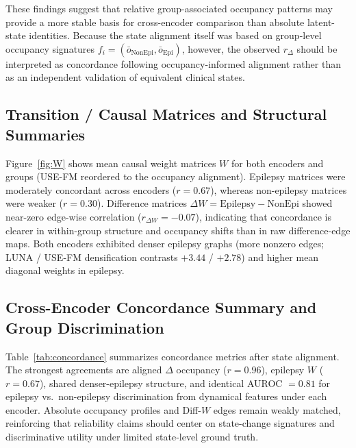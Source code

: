 These findings suggest that relative group-associated occupancy patterns may
provide a more stable basis for cross-encoder comparison than absolute
latent-state identities. Because the state alignment itself was based on
group-level occupancy signatures
$f_i=(\bar{o}_{\mathrm{NonEpi}},\bar{o}_{\mathrm{Epi}})$,
however, the observed $r_{\Delta}$ should be interpreted as concordance
following occupancy-informed alignment rather than as an independent validation
of equivalent clinical states.


\subsection{Transition / Causal Matrices and Structural Summaries}

Figure~\ref{fig:W} shows mean causal weight matrices $W$ for both encoders and
groups (USE-FM reordered to the occupancy alignment). Epilepsy matrices were
moderately concordant across encoders ($r=0.67$), whereas non-epilepsy matrices
were weaker ($r=0.30$). Difference matrices
$\Delta W=\mathrm{Epilepsy}-\mathrm{NonEpi}$ showed near-zero edge-wise
correlation ($r_{\Delta W}=-0.07$), indicating that concordance is clearer in
within-group structure and occupancy shifts than in raw difference-edge maps.
Both encoders exhibited denser epilepsy graphs (more nonzero edges; LUNA /
USE-FM densification contrasts $+3.44$ / $+2.78$) and higher mean diagonal
weights in epilepsy.


\subsection{Cross-Encoder Concordance Summary and Group Discrimination}

Table~\ref{tab:concordance} summarizes concordance metrics after state
alignment. The strongest agreements are aligned $\Delta$ occupancy
($r=0.96$), epilepsy $W$ ($r=0.67$), shared denser-epilepsy structure, and
identical AUROC $=0.81$ for epilepsy vs.\ non-epilepsy discrimination from
dynamical features under each encoder. Absolute occupancy profiles and Diff-$W$
edges remain weakly matched, reinforcing that reliability claims should center
on state-change signatures and discriminative utility under limited
state-level ground truth.

